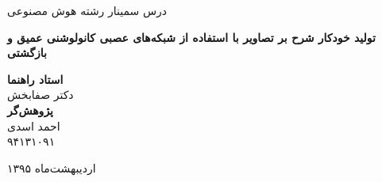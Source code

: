 \thispagestyle{empty}


\begin{center}
\large{درس سمینار رشته هوش مصنوعی}
\end{center}


\begin{center}

\LARGE{\textbf{
تولید خودکار شرح بر تصاویر با استفاده از شبکه‌های عصبی کانولوشنی عمیق و بازگشتی
}}
\\
\vspace{5mm}
\small{
}

\vspace{2cm}
\Large{
\textbf{
استاد راهنما}
\\}
\vspace{2mm}
\large{
 دکتر صفابخش
}
\\
\vspace{1cm}
\Large{
\textbf{پژوهش‌گر}
\\
\vspace{2mm}
\large{
احمد اسدی\\
۹۴۱۳۱۰۹۱
}
}
\end{center}

\begin{center}
%
%
\vfill
اردیبهشت‌ماه ۱۳۹۵
\end{center}


